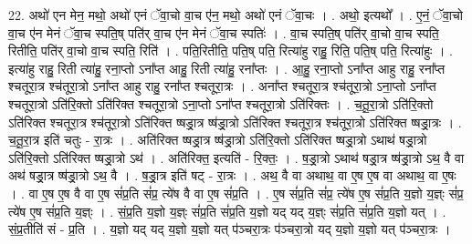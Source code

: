 \documentclass[17pt]{extarticle}
\begin{document}
22. अथो॑ एन मेन॒ मथो॒ अथो॑ एनं ॅवा॒चो वा॒च ए॑न॒ मथो॒ अथो॑ एनं ॅवा॒चः । . अथो॒ इत्यथो᳚ । . ए॒नं॒ ॅवा॒चो वा॒च ए॑न मेनं ॅवा॒च स्पति॒ष् पति॑र् वा॒च ए॑न मेनं ॅवा॒च स्पतिः॑ । . वा॒च स्पति॒ष् पति॑र् वा॒चो वा॒च स्पति॒ रितीति॒ पति॑र् वा॒चो वा॒च स्पति॒ रिति॑ । . पति॒रितीति॒ पति॒ष् पति॒ रित्या॑हु राहु॒ रिति॒ पति॒ष् पति॒ रित्या॑हुः । . इत्या॑हु राहु॒ रिती त्या॑हु॒ रना॒प्तो ऽना᳚प्त आहु॒ रिती त्या॑हु॒ रना᳚प्तः । . आ॒हु॒ रना॒प्तो ऽना᳚प्त आहु राहु॒ रना᳚प्त श्चतूरा॒त्र श्च॑तूरा॒त्रो ऽना᳚प्त आहु राहु॒ रना᳚प्त श्चतूरा॒त्रः । . अना᳚प्त श्चतूरा॒त्र श्च॑तूरा॒त्रो ऽना॒प्तो ऽना᳚प्त श्चतूरा॒त्रो ऽति॑रि॒क्तो ऽति॑रिक्त श्चतूरा॒त्रो ऽना॒प्तो ऽना᳚प्त श्चतूरा॒त्रो ऽति॑रिक्तः । . च॒तू॒रा॒त्रो ऽति॑रि॒क्तो ऽति॑रिक्त श्चतूरा॒त्र श्च॑तूरा॒त्रो ऽति॑रिक्त ष्षड्रा॒त्र ष्ष॑ड्रा॒त्रो ऽति॑रिक्त श्चतूरा॒त्र श्च॑तूरा॒त्रो ऽति॑रिक्त ष्षड्रा॒त्रः । . च॒तू॒रा॒त्र इति॑ चतुः - रा॒त्रः । . अति॑रिक्त ष्षड्रा॒त्र ष्ष॑ड्रा॒त्रो ऽति॑रि॒क्तो ऽति॑रिक्त ष्षड्रा॒त्रो ऽथाथ॑ षड्रा॒त्रो ऽति॑रि॒क्तो ऽति॑रिक्त ष्षड्रा॒त्रो ऽथ॑ । . अति॑रिक्त॒ इत्यति॑ - रि॒क्तः॒ । . ष॒ड्रा॒त्रो ऽथाथ॑ षड्रा॒त्र ष्ष॑ड्रा॒त्रो ऽथ॒ वै वा अथ॑ षड्रा॒त्र ष्ष॑ड्रा॒त्रो ऽथ॒ वै । . ष॒ड्रा॒त्र इति॑ षट् - रा॒त्रः । . अथ॒ वै वा अथाथ॒ वा ए॒ष ए॒ष वा अथाथ॒ वा ए॒षः । . वा ए॒ष ए॒ष वै वा ए॒ष सं॑प्र॒ति सं॑प्र॒ त्ये॑ष वै वा ए॒ष सं॑प्र॒ति । . ए॒ष सं॑प्र॒ति सं॑प्र॒ त्ये॑ष ए॒ष सं॑प्र॒ति य॒ज्ञो य॒ज्ञ्ः सं॑प्र॒ त्ये॑ष ए॒ष सं॑प्र॒ति य॒ज्ञ्ः । . सं॒प्र॒ति य॒ज्ञो य॒ज्ञ्ः सं॑प्र॒ति सं॑प्र॒ति य॒ज्ञो यद् यद् य॒ज्ञ्ः सं॑प्र॒ति सं॑प्र॒ति य॒ज्ञो यत् । . सं॒प्र॒तीति॑ सं - प्र॒ति । . य॒ज्ञो यद् यद् य॒ज्ञो य॒ज्ञो यत् प॑ञ्चरा॒त्रः प॑ञ्चरा॒त्रो यद् य॒ज्ञो य॒ज्ञो यत् प॑ञ्चरा॒त्रः । \newline
\end{document}
